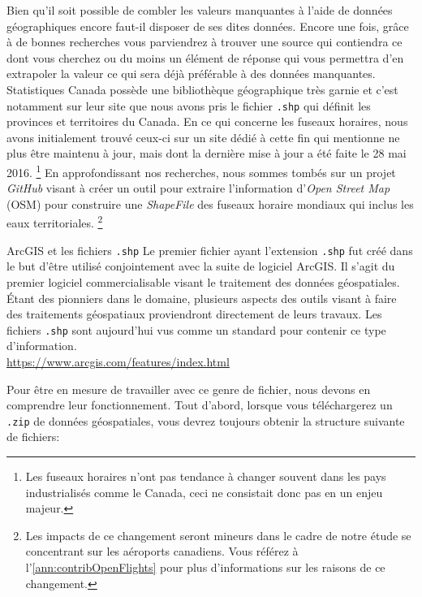 Bien qu'il soit possible de combler les valeurs manquantes à l'aide de données géographiques encore faut-il disposer de ses dites données. Encore une fois, grâce à de bonnes recherches vous parviendrez à trouver une source qui contiendra ce dont vous cherchez ou du moins un élément de réponse qui vous permettra d'en extrapoler la valeur ce qui sera déjà préférable à des données manquantes. Statistiques Canada possède une bibliothèque géographique très garnie et c'est notamment sur leur site que nous avons pris le fichier \texttt{.shp} qui définit les provinces et territoires du Canada. \cite{Data:BoundaryFiles} En ce qui concerne les fuseaux horaires, nous avons initialement trouvé ceux-ci sur un site \cite{Data:tzWorldwide} dédié à cette fin qui mentionne ne plus être maintenu à jour, mais dont la dernière mise à jour a été faite le 28 mai 2016. \footnote{Les fuseaux horaires n'ont pas tendance à changer souvent dans les pays industrialisés comme le Canada, ceci ne consistait donc pas en un enjeu majeur.} En approfondissant nos recherches, nous sommes tombés sur un projet \emph{GitHub} visant à 
créer un outil pour extraire l'information d'\emph{Open Street Map} (OSM) pour construire une \emph{ShapeFile} des fuseaux horaire mondiaux qui inclus les eaux territoriales. \cite{timezone-boundary-builder} \footnote{Les impacts de ce changement seront mineurs dans le cadre de notre étude se concentrant sur les aéroports canadiens. Vous référez à l'\autoref{ann:contribOpenFlights} pour plus d'informations sur les raisons de ce changement.} \\

\begin{moreInfo}{ArcGIS et les fichiers \texttt{.shp}}
	Le premier fichier ayant l'extension \texttt{.shp} fut créé dans le but d'être utilisé conjointement avec la suite de logiciel ArcGIS. Il s'agit du premier logiciel commercialisable visant le traitement des données géospatiales. Étant des pionniers dans le domaine, plusieurs aspects des outils visant à faire des traitements géospatiaux proviendront directement de leurs travaux. Les fichiers \texttt{.shp} sont aujourd'hui vus comme un standard pour contenir ce type d'information. \\
\url{https://www.arcgis.com/features/index.html}
\end{moreInfo}

Pour être en mesure de travailler avec ce genre de fichier, nous devons en comprendre leur fonctionnement. Tout d'abord, lorsque vous téléchargerez un \texttt{.zip} de données géospatiales, vous devrez toujours obtenir la structure suivante de fichiers: \\

